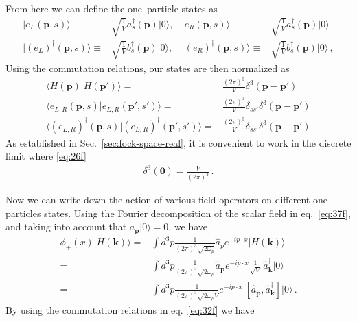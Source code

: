From here we can define the one--particle states as
\begin{align}
  \label{eq:77f}
   | e_L(\mathbf{p},s)\rangle\equiv&\sqrt{\frac{1}{V}}a^\dagger_s(\mathbf{p})|0\rangle, &    | e_R(\mathbf{p},s)\rangle\equiv&\sqrt{\frac{1}{V}}a^\dagger_s(\mathbf{p})|0\rangle\nonumber\\
   | \left( e_L \right)^{\dagger}(\mathbf{p},s)\rangle\equiv&\sqrt{\frac{1}{V}}{b}^\dagger_s(\mathbf{p})|0\rangle,&
   | \left( e_R \right)^{\dagger}(\mathbf{p},s)\rangle\equiv&\sqrt{\frac{1}{V}}{b}^\dagger_s(\mathbf{p})|0\rangle\,, 
\end{align}
Using the commutation relations, our states are then normalized as
\begin{align}
\langle H(\mathbf{p})| H(\mathbf{p}')\rangle=&\frac{(2\pi)^3}{V}\delta^3(\mathbf{p}-\mathbf{p}')\nonumber\\
\langle e_{L,R}(\mathbf{p},s)| e_{L,R}(\mathbf{p}',s')\rangle=&\frac{(2\pi)^3}{V}\delta_{s s'}\delta^3(\mathbf{p}-\mathbf{p}')\nonumber\\
\langle \left( e_{L,R} \right)^{\dagger}(\mathbf{p},s)| \left( e_{L,R} \right)^{\dagger}(\mathbf{p}',s')\rangle=&\frac{(2\pi)^3}{V}\delta_{s s'}\delta^3(\mathbf{p}-\mathbf{p}')
\end{align}
As established in Sec.~\ref{sec:fock-space-real}, it is convenient to work in the discrete limit where \eqref{eq:26f}
\begin{align}
   \delta^3(\mathbf{0})=\frac{V}{(2\pi)^3}\,.
\end{align}

Now we can write down the action of various field operators on different one particles states. 
Using the Fourier decomposition  of the scalar field in eq.~\eqref{eq:37f}, and taking into account that 
$a_{\mathbf{p}}|0\rangle=0$, we have
\begin{align}
\label{eq:98f}
   \phi_+(x)|H(\mathbf{k})\rangle=&\int d^3p \frac{1}{(2\pi)^3\sqrt{2\omega_{p} }}
\widehat{a}_{p} e^{-i p\cdot x }
|H(\mathbf{k})\rangle\nonumber\\
=&\int d^3p \frac{1}{(2\pi)^3\sqrt{2\omega_{p}}}
\widehat{a}_\mathbf{p} e^{-i p\cdot x }
\frac{1}{\sqrt{V}}\, \widehat{a}^\dagger_{\mathbf{k}}|0\rangle\nonumber\\
  =&\int d^3p \frac{1}{(2\pi)^3\sqrt{2\omega_{p}V}} e^{-i p\cdot x }
\, [\widehat{a}_{\mathbf{p}},\widehat{a}^\dagger_{\mathbf{k}}]|0\rangle\,.
\end{align}
By using the commutation relations in eq.~\eqref{eq:32f} we have

